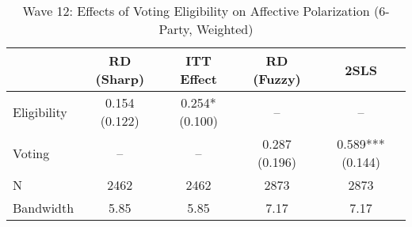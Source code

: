 \begin{table}[htbp]
\centering
\caption{Wave 12: Effects of Voting Eligibility on Affective Polarization (6-Party, Weighted)}
\label{tab:wave12_l6_w}
\begin{tabular}{lcccc}
\hline
 & RD (Sharp) & ITT Effect & RD (Fuzzy) & 2SLS \\
\hline
Eligibility & 0.154 (0.122) & 0.254* (0.100) & -- & -- \\
Voting & -- & -- & 0.287 (0.196) & 0.589*** (0.144) \\
\hline
N & 2462 & 2462 & 2873 & 2873 \\
Bandwidth & 5.85 & 5.85 & 7.17 & 7.17 \\
\hline
\end{tabular}
\end{table}
